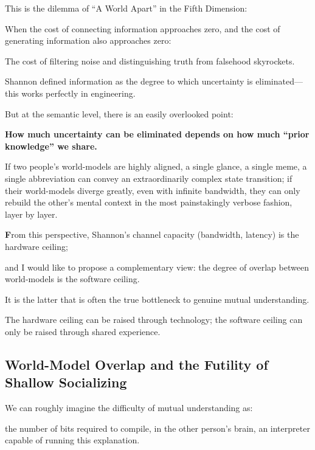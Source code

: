\vspace{1em}

This is the dilemma of ``A World Apart'' in the Fifth Dimension:

When the cost of connecting information approaches zero, and the cost of generating information also approaches zero:
\begin{importantbox}
The cost of filtering noise and distinguishing truth from falsehood skyrockets.
\end{importantbox}

Shannon defined information as the degree to which uncertainty is eliminated---this works perfectly in engineering.

But at the semantic level, there is an easily overlooked point:

\textbf{How much uncertainty can be eliminated depends on how much ``prior knowledge'' we share.}

\vspace{1em}

If two people's world-models are highly aligned,
a single glance, a single meme, a single abbreviation can convey an extraordinarily complex state transition;
if their world-models diverge greatly,
even with infinite bandwidth, they can only rebuild the other's mental context
in the most painstakingly verbose fashion, layer by layer.

\vspace{1em}

\textbf{F}rom this perspective, Shannon's channel capacity (bandwidth, latency) is the hardware ceiling;

and I would like to propose a complementary view: the degree of overlap between world-models is the software ceiling.

It is the latter that is often the true bottleneck to genuine mutual understanding.

The hardware ceiling can be raised through technology; the software ceiling can only be raised through shared experience.

\subsection{World-Model Overlap and the Futility of Shallow Socializing}

We can roughly imagine the difficulty of mutual understanding as:

the number of bits required to compile, in the other person's brain, an interpreter capable of running this explanation.

